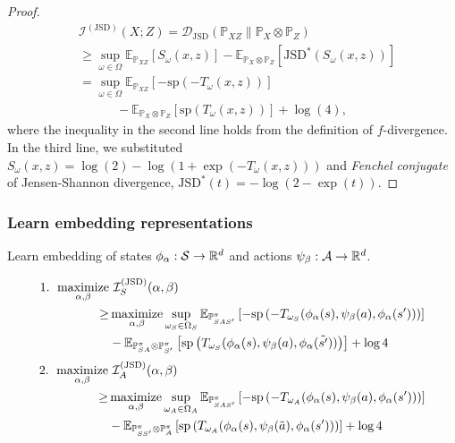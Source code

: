 \documentclass[10pt,mathserif]{beamer}
\begin{document}
\begin{frame}
\begin{proof}
\begin{align*}
    &\mathcal{I}^{(\text{JSD})}(X; Z) = \mathcal{D}_\text{JSD}(\mathbb{P}_{XZ} \parallel \mathbb{P}_{X} \otimes \mathbb{P}_Z)\nonumber\\
    &\geq \sup_{\omega \in \Omega} \mathbb{E}_{\mathbb{P}_{XZ}} \left[S_\omega(x,z)\right] - \mathbb{E}_{\mathbb{P}_{X} \otimes \mathbb{P}_Z} \left[\text{JSD}^{*}\left(S_\omega(x,z)\right)\right] \nonumber\\
    &= \sup_{\omega \in \Omega} \mathbb{E}_{\mathbb{P}_{XZ}} \left[-\text{sp} \left(-T_{\omega}(x,z)\right)\right] \nonumber \\ 
    & \qquad \quad - \mathbb{E}_{\mathbb{P}_{X} \otimes \mathbb{P}_Z} \left[ \text{sp} \left(T_{\omega}(x,z)\right)\right] +\log(4),
\end{align*}
where the inequality in the second line holds from the definition of $f$-divergence. In the third line, we substituted $S_\omega(x,z) = \log(2) - \log(1+\exp(-T_\omega(x,z)))$ and \textit{Fenchel conjugate} of Jensen-Shannon divergence, $\text{JSD}^{*}(t) = -\log(2-\exp(t))$.
\end{proof}
\end{frame}


\begin{frame}
\frametitle{Learn embedding representations}

Learn embedding of states $\phi_\alpha : \mathcal{S} \rightarrow \mathbb R^d$ and actions $\psi_\beta: \mathcal{A} \rightarrow \mathbb R^d$.


\begin{align} 
\text{1. }\operatorname*{maximize}_{\alpha, \beta}&~ \mathcal{I}^{\text{(JSD)}}_S(\alpha, \beta) \nonumber \\
\geq& \operatorname*{maximize}_{\alpha, \beta}  \sup_{\omega_S \in \Omega_S}\mathbb{E}_{\mathbb{P}_{SAS'}^\pi} \left[-\text{sp} \left(-T_{\omega_S}(\phi_\alpha(s), \psi_\beta(a), \phi_\alpha(s'))\right)\right] \nonumber \\
& -\mathbb{E}_{\mathbb{P}_{SA}^\pi \otimes \mathbb{P}_{S'}^\pi} \left[ \text{sp} \left(T_{\omega_S}(\phi_\alpha(s), \psi_\beta(a), \phi_\alpha(\tilde{s'}))\right)\right] + \log{4} \nonumber
\end{align}\pause
\begin{align}
\text{2. }\operatorname*{maximize}_{\alpha, \beta}&~ \mathcal{I}^{\text{(JSD)}}_A(\alpha, \beta) \nonumber \\
\geq& \operatorname*{maximize}_{\alpha, \beta}  \sup_{\omega_A \in \Omega_A} \mathbb{E}_{\mathbb{P}_{SAS'}^\pi} \left[-\text{sp} \left(-T_{\omega_A}(\phi_\alpha(s), \psi_\beta(a), \phi_\alpha(s'))\right)\right] \nonumber \\
& -\mathbb{E}_{\mathbb{P}_{SS'}^\pi \otimes \mathbb{P}_{A}^\pi} \left[ \text{sp} \left(T_{\omega_A}(\phi_\alpha(s), \psi_\beta(\tilde{a}), \phi_\alpha(s'))\right)\right] +\log{4} \nonumber
\end{align}

\end{frame}
\end{document}
